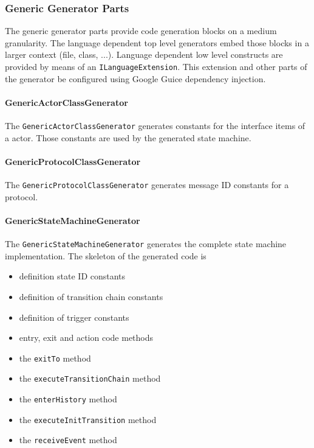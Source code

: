 \subsubsection{Generic Generator Parts}

The generic generator parts provide code generation blocks on a medium granularity. The language dependent 
top level generators embed those blocks in a larger context (file, class, ...). Language dependent low 
level constructs are provided by means of an \texttt{ILanguageExtension}. This extension and other parts 
of the generator be configured using Google Guice dependency injection.

\paragraph{GenericActorClassGenerator}

The \texttt{GenericActorClassGenerator} generates constants for the interface items of a actor. Those 
constants are used by the generated state machine.

\paragraph{GenericProtocolClassGenerator}

The \texttt{GenericProtocolClassGenerator} generates message ID constants for a protocol.

\paragraph{GenericStateMachineGenerator}

\begin{flushleft}The \texttt{GenericStateMachineGenerator} generates the complete state machine 
implementation. The skeleton of the generated code is\end{flushleft}

\begin{itemize}
\item definition state ID constants
\item definition of transition chain constants
\item definition of trigger constants
\item entry, exit and action code methods
\item the \texttt{exitTo} method 
\item the \texttt{executeTransitionChain} method
\item the \texttt{enterHistory} method
\item the \texttt{executeInitTransition} method
\item the \texttt{receiveEvent} method
\end{itemize}

